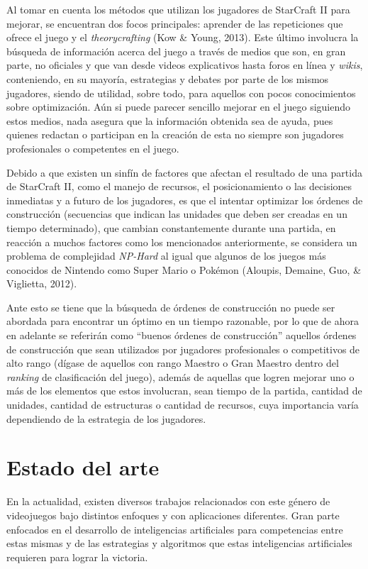 Al tomar en cuenta los métodos que utilizan los jugadores de StarCraft II para mejorar, se encuentran dos focos principales: aprender de las repeticiones que ofrece el juego y el \textit{theorycrafting} (Kow \& Young, 2013). Este último involucra la búsqueda de información acerca del juego a través de medios que son, en gran parte, no oficiales y que van desde videos explicativos hasta foros en línea y \textit{wikis}, conteniendo, en su mayoría, estrategias y debates por parte de los mismos jugadores, siendo de utilidad, sobre todo, para aquellos con pocos conocimientos sobre optimización. Aún si puede parecer sencillo mejorar en el juego siguiendo estos medios, nada asegura que la información obtenida sea de ayuda, pues quienes redactan o participan en la creación de esta no siempre son jugadores profesionales o competentes en el juego. 

Debido a que existen un sinfín de factores que afectan el resultado de una partida de StarCraft II, como el manejo de recursos, el posicionamiento o las decisiones inmediatas y a futuro de los jugadores, es que el intentar optimizar los órdenes de construcción (secuencias que indican las unidades que deben ser creadas en un tiempo determinado), que cambian constantemente durante una partida, en reacción a muchos factores como los mencionados anteriormente, se considera un problema de complejidad \textit{NP-Hard} al igual que algunos de los juegos más conocidos de Nintendo como Super Mario o Pokémon (Aloupis, Demaine, Guo, \& Viglietta, 2012). 

Ante esto se tiene que la búsqueda de órdenes de construcción no puede ser abordada para encontrar un óptimo en un tiempo razonable, por lo que de ahora en adelante se referirán como “buenos órdenes de construcción” aquellos órdenes de construcción que sean utilizados por jugadores profesionales o competitivos de alto rango (dígase de aquellos con rango Maestro o Gran Maestro dentro del \textit{ranking} de clasificación del juego), además de aquellas que logren mejorar uno o más de los elementos que estos involucran, sean tiempo de la partida, cantidad de unidades, cantidad de estructuras o cantidad de recursos, cuya importancia varía dependiendo de la estrategia de los jugadores.

\section{Estado del arte}

En la actualidad, existen diversos trabajos relacionados con este género de videojuegos bajo distintos enfoques y con aplicaciones diferentes. Gran parte enfocados en el desarrollo de inteligencias artificiales para competencias entre estas mismas y de las estrategias y algoritmos que estas inteligencias artificiales requieren para lograr la victoria.

